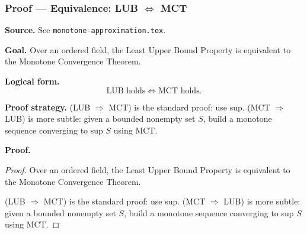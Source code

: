 

\clearpage
{}
\hypertarget{proof-RA-ABB-T-lub-mct-equiv}{}

\subsubsection[Equivalence: LUB $\Longleftrightarrow$ MCT]{Proof --- Equivalence: LUB $\Longleftrightarrow$ MCT}

\bigskip

\noindent
\textbf{Source.} See \texttt{monotone-approximation.tex}.

\vspace{0.75em}

\noindent
\textbf{Goal.} Over an ordered field, the Least Upper Bound Property is equivalent to the Monotone Convergence Theorem.

\vspace{0.75em}

\noindent
\textbf{Logical form.}
\[
  \text{LUB holds} \Longleftrightarrow \text{MCT holds}.
\]

\vspace{0.75em}

\noindent
\textbf{Proof strategy.} (LUB $\Rightarrow$ MCT) is the standard proof: use sup. (MCT $\Rightarrow$ LUB) is more subtle: given a bounded nonempty set $S$, build a monotone sequence converging to sup $S$ using MCT.

\vspace{0.75em}

\noindent
\textbf{Proof.}
\begin{proof}
\Claim Over an ordered field, the Least Upper Bound Property is equivalent to the Monotone Convergence Theorem.

\Given 

\Goal 

\Strategy (LUB $\Rightarrow$ MCT) is the standard proof: use sup. (MCT $\Rightarrow$ LUB) is more subtle: given a bounded nonempty set $S$, build a monotone sequence converging to sup $S$ using MCT.

\medskip


\end{proof}

